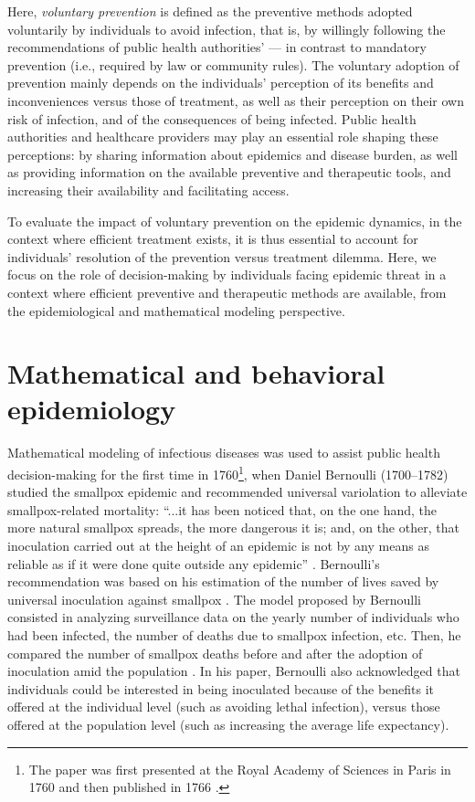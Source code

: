 Here, \textit{voluntary prevention} is defined as the preventive methods adopted voluntarily by individuals to avoid infection, that is, by willingly following the recommendations of public health authorities' --- in contrast to mandatory prevention (i.e., required by law or community rules). The voluntary adoption of prevention mainly depends on the individuals' perception of its benefits and inconveniences versus those of treatment, as well as their perception on their own risk of infection, and of the consequences of being infected. Public health authorities and healthcare providers may play an essential role shaping these perceptions: by sharing information about epidemics and disease burden, as well as providing information on the available preventive and therapeutic tools, and increasing their availability and facilitating access.%

To evaluate the impact of voluntary prevention on the epidemic dynamics, in the context where efficient treatment exists, it is thus essential to account for individuals' resolution of the prevention versus treatment dilemma. Here, we focus on the role of decision-making by individuals facing epidemic threat in a context where efficient preventive and therapeutic methods are available, from the epidemiological and mathematical modeling perspective.

\section{Mathematical and behavioral epidemiology}
\label{Intro:BehavEpi} 

Mathematical modeling of infectious diseases was used to assist public health decision-making for the first time in 1760\footnote{The paper was first presented at the Royal Academy of Sciences in Paris in 1760 and then published in 1766 \cite[]{Bernoulli1766}.}, when Daniel Bernoulli (1700--1782) studied the smallpox epidemic and recommended universal variolation to alleviate smallpox-related mortality: ``...it has been noticed that, on the one hand, the more natural smallpox spreads, the more dangerous it is; and, on the other, that inoculation carried out at the height of an epidemic is not by any means as reliable as if it were done quite outside any epidemic'' \cite[]{Blower2004}. Bernoulli's recommendation was based on his estimation of the number of lives saved by universal inoculation against smallpox \cite[]{Blower2004}. The model proposed by Bernoulli consisted in analyzing surveillance data on the yearly number of individuals who had been infected, the number of deaths due to smallpox infection, etc. Then, he compared the number of smallpox deaths before and after the adoption of inoculation amid the population \cite[]{Blower2004,Dietz2002}. In his paper, Bernoulli also acknowledged that individuals could be interested in being inoculated because of the benefits it offered at the individual level (such as avoiding lethal infection), versus those offered at the population level (such as increasing the average life expectancy).

